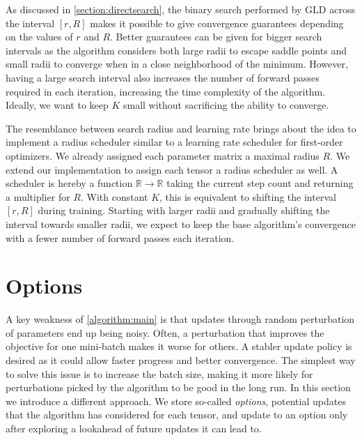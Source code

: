 As discussed in \autoref{section:directsearch}, the 
binary search performed by \ac{GLD} 
across the interval $[r, R]$
makes it possible to give
convergence guarantees depending
on the values of $r$ and $R$. Better guarantees
can be given for bigger search intervals as the algorithm
considers both large radii to escape saddle points
and small radii to converge when in a close neighborhood
of the minimum. However, having a large search interval 
also increases the number of forward passes required
in each iteration, increasing the time complexity 
of the algorithm. Ideally, we want to keep $K$ small 
without sacrificing the ability to converge. 

The resemblance between search radius and learning rate 
brings about the idea to implement a radius 
scheduler similar to a learning rate scheduler for 
first-order optimizers. We already assigned each parameter
matrix a maximal radius $R$. We extend our implementation 
to assign each tensor a radius scheduler as well.
A scheduler is hereby a function 
$\mathbb{R} \rightarrow \mathbb{R}$ taking 
the current step count and returning a multiplier 
for $R$. With constant $K$, this is 
equivalent to shifting the interval $[r, R]$ 
during training. Starting with larger radii and 
gradually shifting the interval towards smaller radii,
we expect to keep the base algorithm's convergence
with a fewer number of forward passes each iteration. 

\section{Options}
A key weakness of \autoref{algorithm:main} is that 
updates through random perturbation of parameters end up
being noisy. Often, a perturbation that improves 
the objective for one mini-batch makes it worse 
for others. A stabler update policy is desired as it could
allow faster progress and better convergence. The simplest
way to solve this issue is to increase the batch size, 
making it more likely for perturbations picked by the 
algorithm to be good in the long run. In this section
we introduce a different approach. We store so-called
\textit{options}, potential updates 
that the algorithm has considered for each tensor,
and update to an option only after exploring a lookahead
of future updates it can lead to. 

